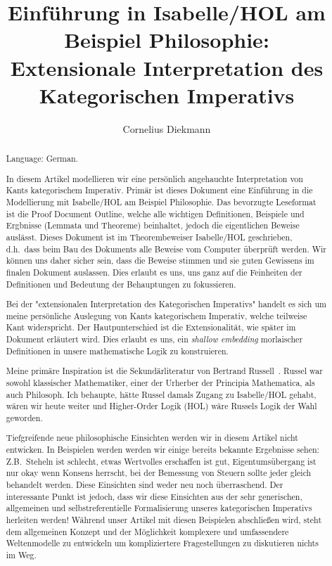\documentclass[11pt,a4paper]{article}
\begin{document}
\title{Einführung in Isabelle/HOL am Beispiel Philosophie:\\
Extensionale Interpretation des Kategorischen Imperativs}
\author{Cornelius Diekmann}
\maketitle

\begin{abstract}

Language: German.

\medskip

In diesem Artikel modellieren wir eine persönlich angehauchte
Interpretation von Kants kategorischem Imperativ.
Primär ist dieses Dokument eine Einführung in die Modellierung mit Isabelle/HOL
am Beispiel Philosophie.
Das bevorzugte Leseformat ist die Proof Document Outline,
welche alle wichtigen Definitionen, Beispiele und Ergbnisse (Lemmata und Theoreme) beinhaltet,
jedoch die eigentlichen Beweise auslässt.
Dieses Dokument ist im Theorembeweiser Isabelle/HOL geschrieben,
d.h.\ dass beim Bau des Dokuments alle Beweise vom Computer überprüft werden.
Wir können uns daher sicher sein, dass die Beweise stimmen
und sie guten Gewissens im finalen Dokument auslassen.
Dies erlaubt es uns, uns ganz auf die Feinheiten der Definitionen
und Bedeutung der Behauptungen zu fokussieren.


Bei der "extensionalen Interpretation des Kategorischen Imperativs" handelt es sich
um meine persönliche Auslegung von Kants kategorischem Imperativ,
welche teilweise Kant widerspricht.
Der Hautpunterschied ist die Extensionalität, wie später im Dokument erläutert wird.
Dies erlaubt es uns, ein \emph{shallow embedding} morlaischer Definitionen in
unsere mathematische Logik zu konstruieren.

Meine primäre Inspiration ist die Sekundärliteratur von Bertrand Russell~\cite{russellphi}.
Russel war sowohl klassischer Mathematiker, einer der Urherber der Principia Mathematica,
als auch Philosoph.
Ich behaupte, hätte Russel damals Zugang zu Isabelle/HOL gehabt, wären wir heute weiter
und Higher-Order Logik (HOL) wäre Russels Logik der Wahl geworden.

Tiefgreifende neue philosophische Einsichten werden wir in diesem Artikel nicht entwicken.
In Beispielen werden werden wir einige bereits bekannte Ergebnisse sehen:
Z.B.\ Steheln ist schlecht, etwas Wertvolles erschaffen ist gut,
Eigentumsübergang ist nur okay wenn Konsens herrscht,
bei der Bemessung von Steuern sollte jeder gleich behandelt werden.
Diese Einsichten sind weder neu noch überraschend.
Der interessante Punkt ist jedoch,
dass wir diese Einsichten aus der sehr generischen, allgemeinen und selbstreferentielle Formalisierung
unseres kategorischen Imperativs herleiten werden!
Während unser Artikel mit diesen Beispielen abschließen wird,
steht dem allgemeinen Konzept und der Möglichkeit komplexere
und umfassendere Weltenmodelle zu entwickeln um kompliziertere Fragestellungen zu diskutieren
nichts im Weg.
\end{abstract}
\end{document}
